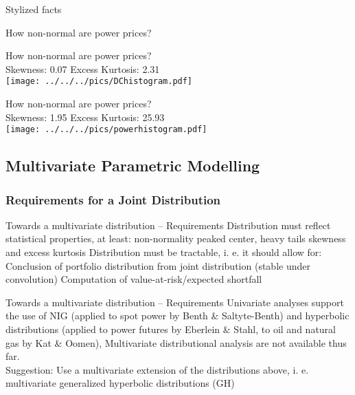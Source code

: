 Stylized facts
	\begin{center}
	How non-normal are power prices?\\
	\end{center}
	
	\begin{center}
	How non-normal are power prices?\\
	Skewness: 0.07 \hspace{2cm} Excess Kurtosis: 2.31\\
	\texttt{[image: ../../../pics/DChistogram.pdf]}
	\end{center}
	
	\begin{center}
	How non-normal are power prices?\\
	Skewness: 1.95 \hspace{2cm} Excess Kurtosis: 25.93\\
	\texttt{[image: ../../../pics/powerhistogram.pdf]}
	\end{center}


\subsection{Multivariate Parametric Modelling}
\subsubsection{Requirements for a Joint Distribution}

Towards a multivariate distribution -- Requirements
 Distribution must reflect statistical properties, at least:
     non-normality
     peaked center, heavy tails
     skewness and excess kurtosis
 Distribution must be tractable, i. e. it should allow for:
     Conclusion of portfolio distribution from joint distribution (stable under convolution)
     Computation of value-at-risk/expected shortfall
  

Towards a multivariate distribution -- Requirements
	Univariate analyses support the use of NIG (applied to spot power
	by Benth \& Saltyte-Benth) and hyperbolic distributions (applied
	to power futures by Eberlein \& Stahl, to oil and natural gas by
	Kat \& Oomen), Multivariate distributional analysis are not
	available thus far.\\

	Suggestion: Use a multivariate extension of the distributions
	above, i. e. multivariate generalized hyperbolic distributions
	(GH)


